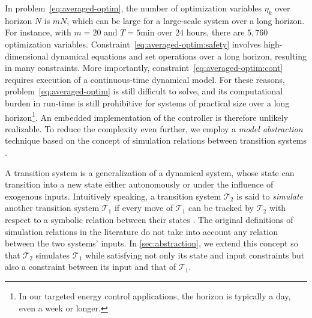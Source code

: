 In problem~\eqref{eq:averaged-optim}, the number of optimization variables $\eta_k$ over horizon $N$ %
is $mN$, which can be large for a large-scale system over a long horizon.
For instance, with $m=20$ %
and %
$T = 5 \text{min}$ over $24$ hours, %
there are $5 \comma 760$ optimization variables.
Constraint~\eqref{eq:averaged-optim:safety} involves high-dimensional dynamical equations and set operations over a long horizon, resulting in many constraints.
More importantly, constraint~\eqref{eq:averaged-optim:cont} requires execution of a continuous-time dynamical model.
For these reasons, problem~\eqref{eq:averaged-optim} is still difficult to solve, and its computational burden in run-time is still prohibitive for systems of practical size over a long horizon\footnote{In our targeted energy control applications, the horizon is typically a day, even a week or longer.}.
An embedded implementation of the controller is therefore unlikely realizable.
To reduce the complexity even further, we employ a \emph{model abstraction} technique based on the concept of simulation relations between transition systems \cite{aluretal00dah,girardetal07amd}.

A transition system is a generalization of a dynamical system, whose state can
transition into a new state either autonomously or under the influence of
exogenous inputs.
Intuitively speaking, a transition system $\mathcal{T}_2$ is said to {\emph{simulate}} another
transition system $\mathcal{T}_1$ if every move of $\mathcal{T}_1$ can be
tracked by $\mathcal{T}_2$ with respect to a symbolic relation between their states \cite{girardetal07amd}.
The original definitions of simulation relations in the literature do not take into account %
any relation between the two systems' inputs.
In \cref{sec:abstraction}, we extend this concept so that $\mathcal{T}_2$ simulates
$\mathcal{T}_1$ while satisfying not only its state and input constraints but also a constraint between its input and that of $\mathcal{T}_1$.

